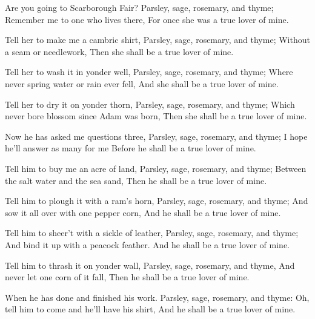 \beginverse
Are you going to Scarborough Fair?
Parsley, sage, rosemary, and thyme;
Remember me to one who lives there,
For once she was a true lover of mine.
\endverse

\beginverse
Tell her to make me a cambric shirt,
Parsley, sage, rosemary, and thyme;
Without a seam or needlework,
Then she shall be a true lover of mine.
\endverse

\beginverse
Tell her to wash it in yonder well,
Parsley, sage, rosemary, and thyme;
Where never spring water or rain ever fell,
And she shall be a true lover of mine.
\endverse

\beginverse
Tell her to dry it on yonder thorn,
Parsley, sage, rosemary, and thyme;
Which never bore blossom since Adam was born,
Then she shall be a true lover of mine.
\endverse

\beginverse
Now he has asked me questions three,
Parsley, sage, rosemary, and thyme;
I hope he'll answer as many for me
Before he shall be a true lover of mine.
\endverse

\beginverse
Tell him to buy me an acre of land,
Parsley, sage, rosemary, and thyme;
Between the salt water and the sea sand,
Then he shall be a true lover of mine.
\endverse

\beginverse
Tell him to plough it with a ram's horn,
Parsley, sage, rosemary, and thyme;
And sow it all over with one pepper corn,
And he shall be a true lover of mine.
\endverse

\beginverse
Tell him to sheer't with a sickle of leather,
Parsley, sage, rosemary, and thyme;
And bind it up with a peacock feather.
And he shall be a true lover of mine.
\endverse

\beginverse
Tell him to thrash it on yonder wall,
Parsley, sage, rosemary, and thyme,
And never let one corn of it fall,
Then he shall be a true lover of mine.
\endverse

\beginverse
When he has done and finished his work.
Parsley, sage, rosemary, and thyme:
Oh, tell him to come and he'll have his shirt,
And he shall be a true lover of mine.
\endverse
\endsong